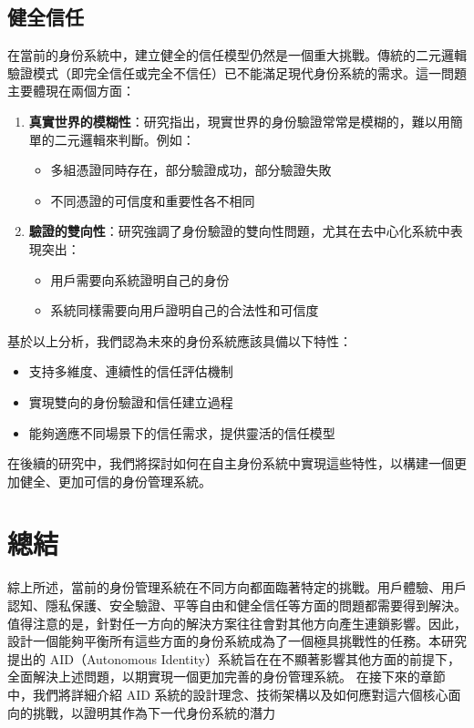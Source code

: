 \subsection{健全信任}
在當前的身份系統中，建立健全的信任模型仍然是一個重大挑戰。傳統的二元邏輯驗證模式（即完全信任或完全不信任）已不能滿足現代身份系統的需求。這一問題主要體現在兩個方面：
\begin{enumerate}
  \item \textbf{真實世界的模糊性}：研究\cite{s22155641}指出，現實世界的身份驗證常常是模糊的，難以用簡單的二元邏輯來判斷。例如：
        \begin{itemize}
          \item 多組憑證同時存在，部分驗證成功，部分驗證失敗
          \item 不同憑證的可信度和重要性各不相同
        \end{itemize}
  \item \textbf{驗證的雙向性}：研究\cite{4489846}強調了身份驗證的雙向性問題，尤其在去中心化系統中表現突出：
        \begin{itemize}
          \item 用戶需要向系統證明自己的身份
          \item 系統同樣需要向用戶證明自己的合法性和可信度
        \end{itemize}
\end{enumerate}
基於以上分析，我們認為未來的身份系統應該具備以下特性：
\begin{itemize}
  \item 支持多維度、連續性的信任評估機制
  \item 實現雙向的身份驗證和信任建立過程
  \item 能夠適應不同場景下的信任需求，提供靈活的信任模型
\end{itemize}
在後續的研究中，我們將探討如何在自主身份系統中實現這些特性，以構建一個更加健全、更加可信的身份管理系統。
\section{總結}
綜上所述，當前的身份管理系統在不同方向都面臨著特定的挑戰。用戶體驗、用戶認知、隱私保護、安全驗證、平等自由和健全信任等方面的問題都需要得到解決。\newline
值得注意的是，針對任一方向的解決方案往往會對其他方向產生連鎖影響。因此，設計一個能夠平衡所有這些方面的身份系統成為了一個極具挑戰性的任務。本研究提出的 AID（Autonomous Identity）系統旨在在不顯著影響其他方面的前提下，全面解決上述問題，以期實現一個更加完善的身份管理系統。\newline
在接下來的章節中，我們將詳細介紹 AID 系統的設計理念、技術架構以及如何應對這六個核心面向的挑戰，以證明其作為下一代身份系統的潛力